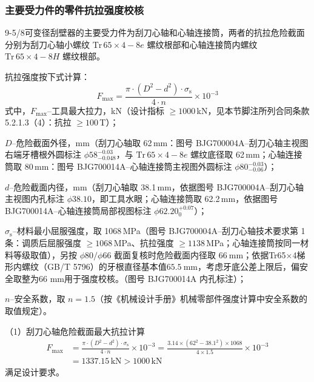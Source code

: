\subsubsection{主要受力件的零件抗拉强度校核}

9-5/8\inch 可变径刮壁器的主要受力件为刮刀心轴和心轴连接筒，两者的抗拉危险截面分别为刮刀心轴小螺纹 $\mathrm{Tr}\,65 \times 4-8e$ 螺纹根部和心轴连接筒内螺纹 $\mathrm{Tr}\,65 \times 4-8H$ 螺纹根部。

抗拉强度按下式计算：
\begin{equation}
    F_{\max} = \frac{\pi \cdot (D^2 - d^2) \cdot \sigma_{\mathrm{s}}}{4 \cdot n} \times 10^{-3}
\end{equation}
式中，$F_{\max}$--工具最大拉力，kN（设计指标 $\ge 1000$\,kN，见本节脚注所列合同条款 5.2.1.3（4）：抗拉 $\ge 100$\,T）；

$D$--危险截面外径，mm（刮刀心轴取 62\,mm：图号 BJG700004A--刮刀心轴主视图右端牙槽根外圆标注 $\phi 58^{-0.03}_{-0.048}$，与 $\mathrm{Tr}\,65\times4-8e$ 螺纹底径取 62\,mm；心轴连接筒取 80\,mm：图号 BJG700014A--心轴连接筒主视图外圆标注 $\phi 80^{-0.03}_{-0.06}$）；

$d$--危险截面内径，mm（刮刀心轴取 38.1\,mm，依据图号 BJG700004A--刮刀心轴主视图内孔标注 $\phi 38.10$，即工具水眼；心轴连接筒取 62.2\,mm，依据图号 BJG700014A--心轴连接筒局部视图标注 $\phi 62.20^{+0.07}_0$）；

$\sigma_{\mathrm{s}}$--材料最小屈服强度，取 1068\,MPa（图号 BJG700004A--刮刀心轴技术要求第 1 条：调质后屈服强度 $\ge 1068$\,MPa、抗拉强度 $\ge 1138$\,MPa；心轴连接筒按同一材料等级取值），另按 $\phi 80/\phi 66$ 截面复核时危险截面内径取 $66\ \mathrm{mm}$；依据Tr65$\times$4梯形内螺纹（GB/T 5796）的牙根直径基本值$65.5\ \mathrm{mm}$，考虑牙底公差上限后，偏安全取整为66 mm用于强度校核。（图号 BJG700014A 内孔标注）；


$n$--安全系数，取 $n = 1.5$（按《机械设计手册》机械零部件强度计算中安全系数的取值规定\cite{ref26}）。

（1）刮刀心轴危险截面最大抗拉计算
\begin{equation}
    \begin{aligned}
    F_{\max} &= \frac{\pi \cdot (D^2 - d^2) \cdot \sigma_{\mathrm{s}}}{4 \cdot n} \times 10^{-3}
             = \frac{3.14 \times (62^2 - 38.1^2) \times 1068}{4 \times 1.5} \times 10^{-3} \\
             &= 1337.15\,\mathrm{kN} > 1000\,\mathrm{kN}
    \end{aligned}
\end{equation}
满足设计要求。

